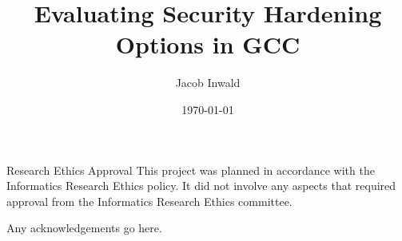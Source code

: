 \documentclass[logo,bsc,singlespacing,parskip]{infthesis}
\begin{document}
\begin{preliminary}

\title{Evaluating Security Hardening Options in GCC}

\author{Jacob Inwald}


\date{\today}

\abstract{

}

\maketitle

\newenvironment{ethics}
   {\begin{frontenv}{Research Ethics Approval}{\LARGE}}
   {\end{frontenv}\newpage}

\begin{ethics}
This project was planned in accordance with the Informatics Research
Ethics policy. It did not involve any aspects that required approval
from the Informatics Research Ethics committee.

\standarddeclaration
\end{ethics}


\begin{acknowledgements}
Any acknowledgements go here.
\end{acknowledgements}


\tableofcontents
\end{preliminary}
\end{document}
